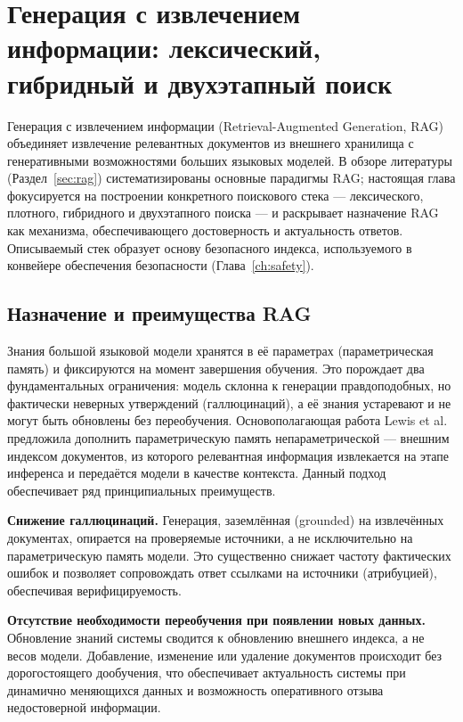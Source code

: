 \chapter{Генерация с извлечением информации: лексический, гибридный и двухэтапный поиск}\label{ch:rag}

Генерация с извлечением информации (Retrieval-Augmented Generation, RAG) объединяет извлечение релевантных документов из внешнего хранилища с генеративными возможностями больших языковых моделей.
В обзоре литературы (Раздел~\ref{sec:rag}) систематизированы основные парадигмы RAG; настоящая глава фокусируется на построении конкретного поискового стека --- лексического, плотного, гибридного и двухэтапного поиска --- и раскрывает назначение RAG как механизма, обеспечивающего достоверность и актуальность ответов.
Описываемый стек образует основу безопасного индекса, используемого в конвейере обеспечения безопасности (Глава~\ref{ch:safety}).

\section{Назначение и преимущества RAG}\label{sec:rag_motivation}

Знания большой языковой модели хранятся в её параметрах (параметрическая память) и фиксируются на момент завершения обучения.
Это порождает два фундаментальных ограничения: модель склонна к генерации правдоподобных, но фактически неверных утверждений (галлюцинаций), а её знания устаревают и не могут быть обновлены без переобучения.
Основополагающая работа Lewis et al.~\cite{2005.11401} предложила дополнить параметрическую память непараметрической --- внешним индексом документов, из которого релевантная информация извлекается на этапе инференса и передаётся модели в качестве контекста.
Данный подход обеспечивает ряд принципиальных преимуществ.

\textbf{Снижение галлюцинаций.} Генерация, заземлённая (grounded) на извлечённых документах, опирается на проверяемые источники, а не исключительно на параметрическую память модели.
Это существенно снижает частоту фактических ошибок и позволяет сопровождать ответ ссылками на источники (атрибуцией), обеспечивая верифицируемость.

\textbf{Отсутствие необходимости переобучения при появлении новых данных.} Обновление знаний системы сводится к обновлению внешнего индекса, а не весов модели.
Добавление, изменение или удаление документов происходит без дорогостоящего дообучения, что обеспечивает актуальность системы при динамично меняющихся данных и возможность оперативного отзыва недостоверной информации.

